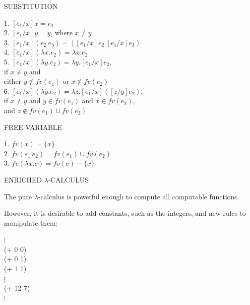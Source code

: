 \begin{slide}{}
\begin{center}
SUBSTITUTION
\end{center}

1. $[e_1/x]x = e_1$\\
2. $[e_1/x]y = y$, where $x \not= y$\\
3. $[e_1/x](e_2 \ e_3) = ([e_1/x]e_2 \ [e_1/x]e_3)$\\
4. $[e_1/x](\lambda x.e_2) = \lambda x.e_2$\\
5. $[e_1/x](\lambda y.e_2) = \lambda y . [e_1/x]e_2$,\\ \hspace*{2em}
		if $x \not= y$ and \\ \hspace*{2em} either $y \not\in fv(e_1)$ 
		or $x \not\in fv(e_2)$\\
6. $[e_1/x](\lambda y.e_2) = \lambda z . [e_1/x]([z/y]e_2)$,\\ \hspace*{2em}
		if $x \not= y$ and $y \in fv(e_1)$ and $x \in fv(e_2)$,\\ \hspace*{2em}
		and $z \not\in fv(e_1) \cup fv(e_2)$

\begin{center}
FREE VARIABLE
\end{center}

1. $fv(x) = \{x\}$\\
2. $fv(e_1 \ e_2) = fv(e_1) \cup fv(e_2)$\\
3. $fv(\lambda x.e) = fv(e)-\{x\}$
\end{slide}


\begin{slide}{}
\begin{center}
	ENRICHED $\lambda$-CALCULUS\\[1in]
\end{center}

\begin{flushleft}
The pure $\lambda$-calculus is powerful enough to compute all
computable functions.

However, it is desirable to add constants, such as the integers,
and new rules to manipulate them:
\end{flushleft}

\begin{center}
$\vdots$\\
(+ 0 0) \\
(+ 0 1) \\
(+ 1 1) \\
$\vdots$\\
(+ 12 7) \\
$\vdots$
\end{center}
\end{slide}


